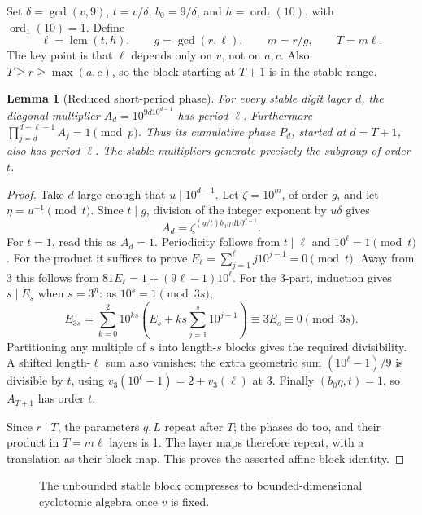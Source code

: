 \documentclass[10pt]{article}
\newtheorem{lemma}{Lemma}
\DeclareMathOperator{\ord}{ord}
\begin{document}
Set \(\delta=\gcd(v,9)\), \(t=v/\delta\),
\(b_0=9/\delta\), and \(h=\ord_t(10)\), with \(\ord_1(10)=1\).
Define
\[
\ell=\operatorname{lcm}(t,h),\qquad
g=\gcd(r,\ell),\qquad m=r/g,\qquad T=m\ell.
\]
The key point is that \(\ell\) depends only on \(v\), not on \(a,c\).
Also \(T\ge r\ge\max(a,c)\), so the block starting at \(T+1\)
is in the stable range.

\begin{lemma}[Reduced short-period phase]\label{lem:phase}
For every stable digit layer \(d\), the diagonal multiplier
\(A_d=10^{9d10^{d-1}}\) has period \(\ell\).
Furthermore \(\prod_{j=d}^{d+\ell-1}A_j=1\pmod p\).
Thus its cumulative phase \(P_d\), started at \(d=T+1\),
also has period \(\ell\). The stable multipliers generate precisely
the subgroup of order \(t\).
\end{lemma}
\begin{proof}
Take \(d\) large enough that \(u\mid10^{d-1}\).
Let \(\zeta=10^m\), of order \(g\), and let
\(\eta=u^{-1}\pmod t\). Since \(t\mid g\), division of the
integer exponent by \(u\delta\) gives
\[
A_d=\zeta^{(g/t)b_0\eta\,d10^{d-1}}.
\]
For \(t=1\), read this as \(A_d=1\).
Periodicity follows from \(t\mid\ell\) and \(10^\ell=1\pmod t\).
For the product it suffices to prove
\(E_\ell=\sum_{j=1}^{\ell}j10^{j-1}=0\pmod t\).
Away from 3 this follows from
\(81E_\ell=1+(9\ell-1)10^\ell\).
For the 3-part, induction gives \(s\mid E_s\) when \(s=3^n\):
as \(10^s=1\pmod{3s}\),
\[
E_{3s}=\sum_{k=0}^2 10^{ks}
 \left(E_s+ks\sum_{j=1}^s10^{j-1}\right)
 \equiv3E_s\equiv0\pmod{3s}.
\]
Partitioning any multiple of \(s\) into length-\(s\) blocks gives
the required divisibility. A shifted length-\(\ell\) sum also
vanishes: the extra geometric sum \((10^\ell-1)/9\) is divisible
by \(t\), using \(v_3(10^\ell-1)=2+v_3(\ell)\) at 3.
Finally \((b_0\eta,t)=1\), so \(A_{T+1}\) has order \(t\).

Since \(r\mid T\), the parameters \(q,L\) repeat after \(T\);
the phases do too, and their product in \(T=m\ell\) layers is 1.
The layer maps therefore repeat, with a translation as their block
map. This proves the asserted affine block identity.
\end{proof}

\begin{figure}[h]
\centering
{}
\caption{The unbounded stable block compresses to bounded-dimensional
cyclotomic algebra once \(v\) is fixed.}
\end{figure}
\end{document}
